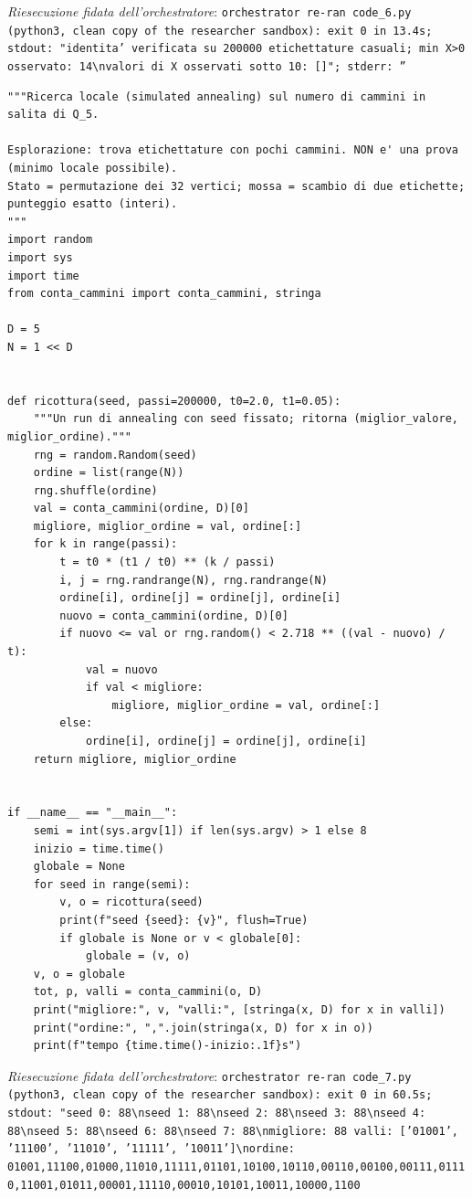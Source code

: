 \documentclass[11pt,a4paper]{article}
\begin{document}
\noindent\emph{Riesecuzione fidata dell'orchestratore}: \texttt{orchestrator re-ran code\_6.py (python3, clean copy of the researcher sandbox): exit 0 in 13.4s; stdout: "identita' verificata su 200000 etichettature casuali; min X\textgreater{}0 osservato: 14\textbackslash{}nvalori di X osservati sotto 10: []"; stderr: ''}
\begin{lstlisting}[caption={attempt\_001 code\_7 [python, rigore float\_exploration\_only] — Simulated annealing over labellings (exploration only): best value found 88 in every seed  — approvato dal Referee}]
"""Ricerca locale (simulated annealing) sul numero di cammini in salita di Q_5.

Esplorazione: trova etichettature con pochi cammini. NON e' una prova (minimo locale possibile).
Stato = permutazione dei 32 vertici; mossa = scambio di due etichette; punteggio esatto (interi).
"""
import random
import sys
import time
from conta_cammini import conta_cammini, stringa

D = 5
N = 1 << D


def ricottura(seed, passi=200000, t0=2.0, t1=0.05):
    """Un run di annealing con seed fissato; ritorna (miglior_valore, miglior_ordine)."""
    rng = random.Random(seed)
    ordine = list(range(N))
    rng.shuffle(ordine)
    val = conta_cammini(ordine, D)[0]
    migliore, miglior_ordine = val, ordine[:]
    for k in range(passi):
        t = t0 * (t1 / t0) ** (k / passi)
        i, j = rng.randrange(N), rng.randrange(N)
        ordine[i], ordine[j] = ordine[j], ordine[i]
        nuovo = conta_cammini(ordine, D)[0]
        if nuovo <= val or rng.random() < 2.718 ** ((val - nuovo) / t):
            val = nuovo
            if val < migliore:
                migliore, miglior_ordine = val, ordine[:]
        else:
            ordine[i], ordine[j] = ordine[j], ordine[i]
    return migliore, miglior_ordine


if __name__ == "__main__":
    semi = int(sys.argv[1]) if len(sys.argv) > 1 else 8
    inizio = time.time()
    globale = None
    for seed in range(semi):
        v, o = ricottura(seed)
        print(f"seed {seed}: {v}", flush=True)
        if globale is None or v < globale[0]:
            globale = (v, o)
    v, o = globale
    tot, p, valli = conta_cammini(o, D)
    print("migliore:", v, "valli:", [stringa(x, D) for x in valli])
    print("ordine:", ",".join(stringa(x, D) for x in o))
    print(f"tempo {time.time()-inizio:.1f}s")

\end{lstlisting}
\noindent\emph{Riesecuzione fidata dell'orchestratore}: \texttt{orchestrator re-ran code\_7.py (python3, clean copy of the researcher sandbox): exit 0 in 60.5s; stdout: "seed 0: 88\textbackslash{}nseed 1: 88\textbackslash{}nseed 2: 88\textbackslash{}nseed 3: 88\textbackslash{}nseed 4: 88\textbackslash{}nseed 5: 88\textbackslash{}nseed 6: 88\textbackslash{}nseed 7: 88\textbackslash{}nmigliore: 88 valli: ['01001', '11100', '11010', '11111', '10011']\textbackslash{}nordine: 01001,11100,01000,11010,11111,01101,10100,10110,00110,00100,00111,01110,11001,01011,00001,11110,00010,10101,10011,10000,1100}
\end{document}
